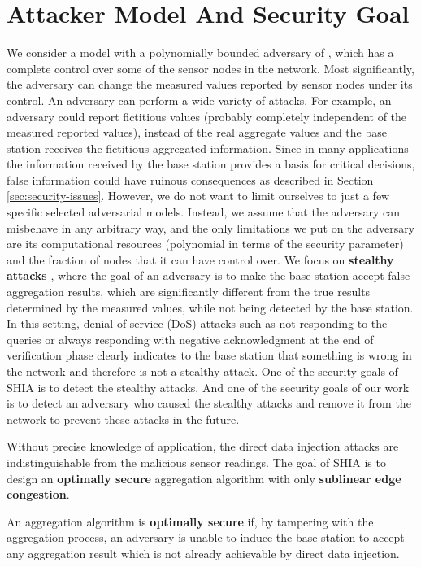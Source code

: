 \section{Attacker Model And Security Goal}
	We consider a model with a polynomially bounded adversary of \cite{przydatek2003sia}, which has a complete control over some of the sensor nodes in the network.
	Most significantly, the adversary can change the measured values reported by sensor nodes under its control.
	An adversary can perform a wide variety of attacks.
	For example, an adversary could report fictitious values (probably completely independent of the measured reported values), instead of the real aggregate values and the base station receives the fictitious aggregated information. 
	Since in many applications the information received by the base station provides a basis for critical decisions, false information could have ruinous consequences as described in Section \ref{sec:security-issues}.
	However, we do not want to limit ourselves to just a few specific selected adversarial models. 
	Instead, we assume that the adversary can misbehave in any arbitrary way, and the only limitations we put on the adversary are its computational resources (polynomial in terms of the security parameter) and the fraction of nodes that it can have control over. 
	We focus on \textbf{stealthy attacks} \cite{przydatek2003sia}, where the goal of an adversary is to make the base station accept false aggregation results, which are significantly different from the true results determined by the measured values, while not being detected by the base station.
	In this setting, denial-of-service (DoS) attacks such as not responding to the queries or always responding with negative acknowledgment at the end of verification phase clearly indicates to the base station that something is wrong in the network and therefore is not a stealthy attack.
	One of the security goals of SHIA is to detect the stealthy attacks.
	And one of the security goals of our work is to detect an adversary who caused the stealthy attacks and remove it from the network to prevent these attacks in the future.
	
	Without precise knowledge of application, the direct data injection attacks are indistinguishable from the malicious sensor readings.
	The goal of SHIA is to design an \textbf{optimally secure} aggregation algorithm with only \textbf{sublinear edge congestion}.
	\begin{definition}
		\label{def:optimally-secure}
		\cite{chan2006secure} An aggregation algorithm is \textbf{optimally secure} if, by tampering with the aggregation process, an adversary is unable to induce the base station to accept any aggregation result which is not already achievable by direct data injection.
	\end{definition}

